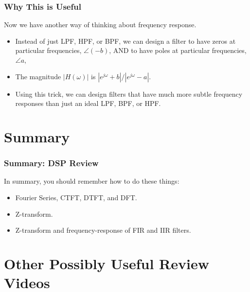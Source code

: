 \documentclass{beamer}
\begin{document}
\begin{frame}
  \frametitle{Why This is Useful}

  Now we have another way of thinking about frequency response.
  \begin{itemize}
    \item Instead of just LPF, HPF, or BPF, we can design a filter to have
      zeros at particular frequencies, $\angle (-b)$, AND to have
      poles at particular frequencies, $\angle a$,
    \item The magnitude $|H(\omega)|$ is
      $|e^{j\omega}+b|/|e^{j\omega}-a|$.
    \item Using this trick, we can design filters that have much more
      subtle frequency responses than just an ideal LPF, BPF, or HPF.
  \end{itemize}
\end{frame}


\section[Summary]{Summary}
\setcounter{subsection}{1}

\begin{frame}
  \frametitle{Summary: DSP Review}
  In summary, you should remember how to do these things:
  \begin{itemize}
  \item Fourier Series, CTFT, DTFT, and DFT.
  \item Z-transform.
  \item Z-transform and frequency-response of FIR and IIR filters.
  \end{itemize}
\end{frame}

\section[Optional]{Other Possibly Useful Review Videos}
\setcounter{subsection}{1}
\end{document}
